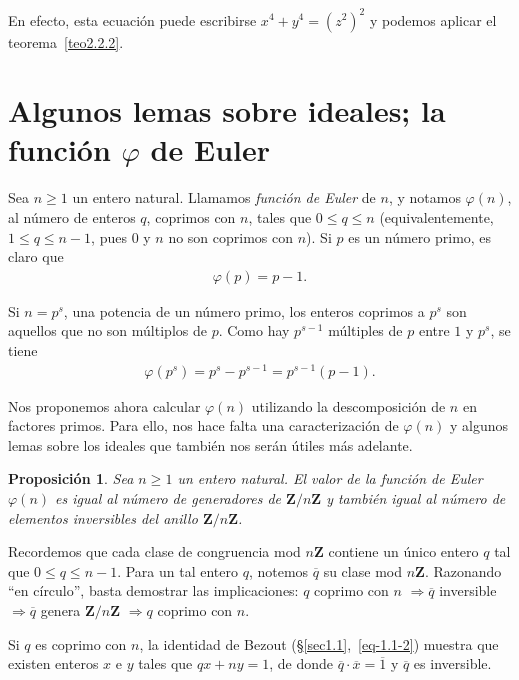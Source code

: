 \documentclass[bibtotoc,leqno,spanish]{amsbook}
\newcommand{\ZZ}{\mathbf{Z}}
\newcommand{\oline}[1]{\overline{#1}}
\newcommand{\then}{\ensuremath{\Rightarrow}\xspace}
\numberwithin{equation}{section}
\theoremstyle{note}
\theoremstyle{note}
\newtheorem{proposition}{Proposici\'on}
\theoremstyle{rem}
\numberwithin{theorem}{section}
\numberwithin{proposition}{section}
\numberwithin{definition}{section}
\numberwithin{lemma}{section}
\numberwithin{corollary}{section}
\numberwithin{example}{section}
\numberwithin{footnote}{section}%
\begin{document}
En efecto, esta ecuaci\'on puede escribirse $x^{4}+y^{4}=(z^{2})^{2}$ y podemos aplicar el teorema~\ref{teo2.2.2}.

\section{Algunos lemas sobre ideales; la funci\'on $\varphi$ de Euler}\label{sec1.3}

Sea $n\geq 1$ un entero natural. Llamamos {\em funci\'on de Euler} de
$n$, y notamos $\varphi(n)$, al n\'umero de enteros $q$, coprimos con $n$, tales que
$0\leq q\leq n$ (equivalentemente, $1\leq q\leq n-1$, pues $0$ y $n$ no son
coprimos con $n$). Si $p$ es un n\'umero primo, es claro que
\begin{gather}
\varphi(p) = p-1.
\end{gather}

Si $n = p^{s}$, una potencia de un n\'umero primo, los enteros coprimos a $p^{s}$ son
aquellos que no son m\'ultiplos de $p$. Como hay $p^{s-1}$ m\'ultiples de $p$ entre $1$ y
$p^{s}$, se tiene
\begin{gather}\label{eq-1.3-2}
\varphi(p^{s}) = p^{s} - p^{s-1} = p^{s-1}(p-1).
\end{gather}

Nos proponemos ahora calcular $\varphi(n)$ utilizando la descomposici\'on de $n$
en factores primos. Para ello, nos hace falta una caracterizaci\'on de $\varphi(n)$ y
algunos lemas sobre los ideales que tambi\'en nos ser\'an \'utiles m\'as adelante.

\begin{proposition}\label{prop1.3.1}
Sea $n\geq 1$ un entero natural. El valor de la funci\'on de Euler $\varphi(n)$ es igual al n\'umero
de generadores de $\ZZ/n\ZZ$ y tambi\'en igual al n\'umero de elementos inversibles del
anillo $\ZZ/n\ZZ$.
\end{proposition}

Recordemos que cada clase de congruencia mod $n\ZZ$ contiene un \'unico entero $q$ tal que
$0\leq q\leq n-1$. Para un tal entero $q$, notemos $\oline q$ su clase mod $n\ZZ$.
Razonando ``en c\'irculo'', basta demostrar las implicaciones: $q$ coprimo con $n$ \then $\oline q$ inversible
\then $\oline q$ genera $\ZZ/n\ZZ$ \then $q$ coprimo con $n$.

Si $q$ es coprimo con $n$, la
identidad de Bezout (\S\ref{sec1.1},~\eqref{eq-1.1-2}) muestra que existen enteros $x$ e $y$ tales que
$qx+ny = 1$, de donde $\oline q\cdot\oline x = \oline 1$ y $\oline q$ es inversible.
\end{document}
